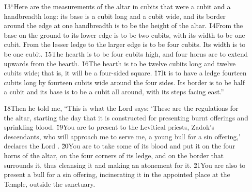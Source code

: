 \v{13}``Here are the measurements of the altar in cubits that were a cubit and a handbreadth long: its base is a cubit long and a cubit wide, and its border around the edge at one handbreadth is to be the height of the altar. \v{14}From the base on the ground to its lower edge is to be two cubits, with its width to be one cubit. From the lesser ledge to the larger edge is to be four cubits. Its width is to be one cubit. \v{15}The hearth is to be four cubits high, and four horns are to extend upwards from the hearth. \v{16}The hearth is to be twelve cubits long and twelve cubits wide; that is, it will be a four-sided square. \v{17}It is to have a ledge fourteen cubits long by fourteen cubits wide around the four sides. Its border is to be half a cubit and its base is to be a cubit all around, with its steps facing east.''

\v{18}Then he told me, ``This is what the Lord  says: `These are the regulations for the altar, starting the day that it is constructed for presenting burnt offerings and sprinkling blood. \v{19}You are to present to the Levitical priests, Zadok's descendants, who will approach me to serve me, a young bull for a sin offering,' declares the Lord . \v{20}You are to take some of its blood and put it on the four horns of the altar, on the four corners of its ledge, and on the border that surrounds it, thus cleansing it and making an atonement for it. \v{21}You are also to present a bull for a sin offering, incinerating it in the appointed place at the Temple, outside the sanctuary.

